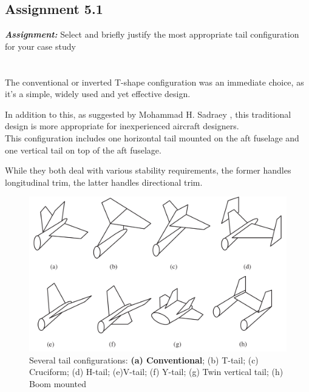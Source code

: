 \documentclass{article}
\begin{document}
\subsection{Assignment 5.1\label{Assignment_5.1}}

\textbf{\textit{Assignment:}} Select and briefly justify the most appropriate
 tail configuration for your case study \\ \\ \\ 

The conventional or inverted T-shape configuration was an immediate choice, as it's a simple, widely
used and yet effective design. 

In addition to this, as suggested by Mohammad H. Sadraey \autocite{Sadraey_Mohammad}, this traditional design is more appropriate
for inexperienced aircraft designers. \\ 

This configuration includes one horizontal tail mounted on the
aft fuselage and one vertical tail on top of the aft fuselage.

While they both deal with various stability requirements, the former handles longitudinal trim, 
the latter handles directional trim. \\ 


\begin{figure}[h!]
    \centering
    \includegraphics[width=\textwidth]{Sources/Plots_and_Pictures/tail_config.png}
    \caption{Several tail configurations: \textbf{(a) Conventional}; (b) T-tail; (c) Cruciform; (d) H-tail;
    (e)V-tail; (f) Y-tail; (g) Twin vertical tail; (h) Boom mounted \autocite{Sadraey_Mohammad}}
    \label{tail_config}
\end{figure}
\end{document}
